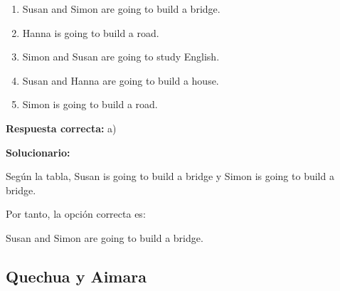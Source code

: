 \begin{enumerate}[resume]
\begin{center}
\end{center}

	\begin{enumerate}[label=\alph*)]
		\item Susan and Simon are going to build a bridge.
		\item Hanna is going to build a road.
		\item Simon and Susan are going to study English.
		\item Susan and Hanna are going to build a house.
		\item Simon is going to build a road.
	\end{enumerate}
	\textbf{Respuesta correcta:} a)
	
	\vspace{2mm}
	\textbf{Solucionario:}
	
	Según la tabla, Susan is going to build a bridge y Simon is going to build a bridge.
	
	Por tanto, la opción correcta es:
	
	Susan and Simon are going to build a bridge.
	
	\vspace{6mm}
	
\end{enumerate}

\subsection*{Quechua y Aimara}


